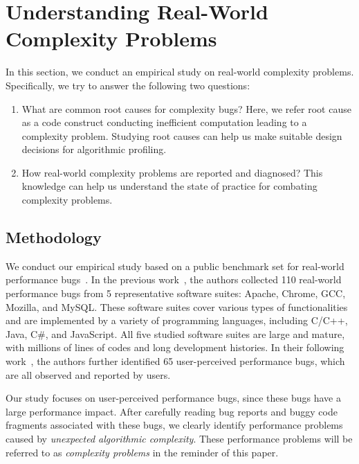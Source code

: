 \section{Understanding Real-World Complexity Problems}
\label{sec:study}

In this section, we conduct an empirical study on real-world complexity problems. 
Specifically, we try to answer the following two questions:

\begin{enumerate}

\item What are common root causes for complexity bugs? 
Here, we refer root cause as a code construct conducting 
inefficient computation leading to a complexity problem.
Studying root causes can help us 
make suitable design decisions for algorithmic profiling. 

\item How real-world complexity problems are reported and diagnosed?
This knowledge can help us understand the 
state of practice for combating complexity problems.

\end{enumerate}

\subsection{Methodology}
\label{sec:meth}

We conduct our empirical study based on a public benchmark set for 
real-world performance bugs~\cite{PerfBug,SongOOPSLA2014}. 
In the previous work~\cite{PerfBug}, 
the authors collected 110 real-world performance bugs from 5 representative 
software suites: Apache, Chrome, GCC, Mozilla, and MySQL. 
These software suites cover various types of functionalities and are implemented 
by a variety of programming languages, including C/C++, Java, C\#, and JavaScript. 
All five studied software suites are large and mature, 
with millions of lines of codes and long development histories. 
In their following work~\cite{SongOOPSLA2014}, 
the authors further identified 65 user-perceived performance bugs, 
which are all observed and reported by users. 

Our study focuses on user-perceived performance bugs, 
since these bugs have a large performance impact.
After carefully reading bug reports and buggy code fragments 
associated with these bugs,
we clearly identify \ComBugs performance problems 
caused by {\textit{unexpected algorithmic complexity}}.
These performance problems will be referred to as 
{\textit{complexity problems}} in the reminder of this paper.

